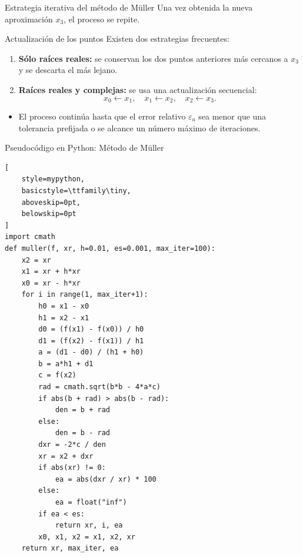 \documentclass[../../main.tex]{subfiles}
\begin{document}
\begin{frame}{Estrategia iterativa del método de Müller}
  Una vez obtenida la nueva aproximación \(x_3\), el proceso se repite.

  \begin{block}{Actualización de los puntos}
    Existen dos estrategias frecuentes:
    \begin{enumerate}
      \item \textbf{Sólo raíces reales:} se conservan los dos puntos
            anteriores más cercanos a \(x_3\) y se descarta el más lejano.
      \item \textbf{Raíces reales y complejas:} se usa una actualización
            secuencial:
            \[
              x_0 \leftarrow x_1, \quad
              x_1 \leftarrow x_2, \quad
              x_2 \leftarrow x_3.
            \]
    \end{enumerate}
  \end{block}

  \begin{itemize}
    \item El proceso continúa hasta que el error relativo \(\varepsilon_a\)
          sea menor que una tolerancia prefijada o se alcance un número
          máximo de iteraciones.
  \end{itemize}
\end{frame}

\begin{frame}[fragile]{Pseudocódigo en Python: Método de Müller}

\begin{lstlisting}[
    style=mypython,
    basicstyle=\ttfamily\tiny,
    aboveskip=0pt,
    belowskip=0pt
]
import cmath
def muller(f, xr, h=0.01, es=0.001, max_iter=100):
    x2 = xr
    x1 = xr + h*xr
    x0 = xr - h*xr
    for i in range(1, max_iter+1):
        h0 = x1 - x0
        h1 = x2 - x1
        d0 = (f(x1) - f(x0)) / h0
        d1 = (f(x2) - f(x1)) / h1
        a = (d1 - d0) / (h1 + h0)
        b = a*h1 + d1
        c = f(x2)
        rad = cmath.sqrt(b*b - 4*a*c)
        if abs(b + rad) > abs(b - rad):
            den = b + rad
        else:
            den = b - rad
        dxr = -2*c / den
        xr = x2 + dxr
        if abs(xr) != 0:
            ea = abs(dxr / xr) * 100
        else:
            ea = float("inf")
        if ea < es:
            return xr, i, ea
        x0, x1, x2 = x1, x2, xr
    return xr, max_iter, ea
\end{lstlisting}

\end{frame}
\end{document}

